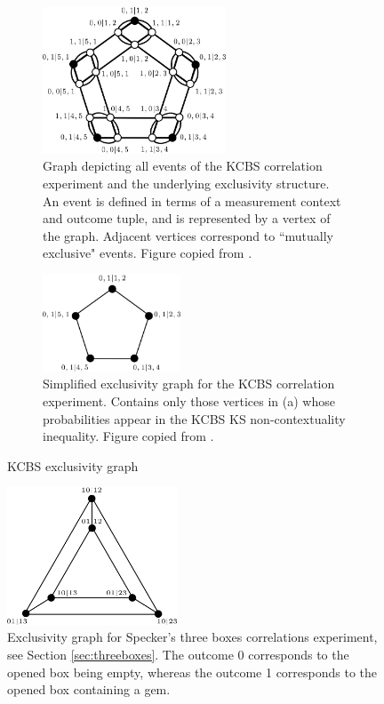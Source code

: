 \begin{figure}
\centering
\begin{subfigure}{\textwidth}
    \centering
    \includegraphics[width=0.6\textwidth]{images/kcbsexclusivity1.png}
    \caption{Graph depicting all events of the KCBS correlation experiment and the underlying exclusivity structure. An event is defined in terms of a measurement context and outcome tuple, and is represented by a vertex of the graph. Adjacent vertices correspond to ``mutually exclusive" events. Figure copied from \cite{Cabello2014}.}
\end{subfigure}
\break\vspace{5ex}
\begin{subfigure}{\textwidth}
    \centering 
    \includegraphics[width=0.45\textwidth]{images/kcbsexclusivity2.png}
    \caption{Simplified exclusivity graph for the KCBS correlation experiment. Contains only those vertices in (a) whose probabilities appear in the KCBS KS non-contextuality inequality. Figure copied from \cite{Cabello2014}.}
\end{subfigure}

\caption{KCBS exclusivity graph}
\label{fig:kcbsexclusivity}
\end{figure}


\begin{figure}
    \centering
    \includegraphics[width=0.45\textwidth]{images/3boxesecl.png}
    \caption{Exclusivity graph for Specker's three boxes correlations experiment, see Section \ref{sec:threeboxes}. The outcome 0 corresponds to the opened box being empty, whereas the outcome 1 corresponds to the opened box containing a gem.}
    \label{fig:3boxesexcl}
\end{figure}

